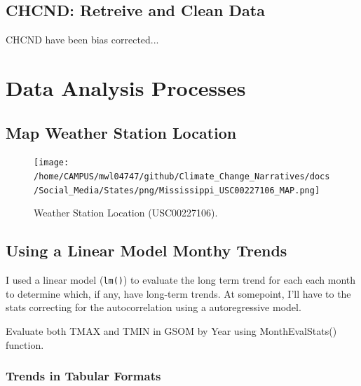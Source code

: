 \documentclass{article}
\begin{document}
\subsection{CHCND: Retreive and Clean Data}

CHCND have been bias corrected...


\section{Data Analysis Processes}

\subsection{Map Weather Station Location}






\begin{figure}
\texttt{[image: /home/CAMPUS/mwl04747/github/Climate\_Change\_Narratives/docs/Social\_Media/States/png/Mississippi\_USC00227106\_MAP.png]}
\caption{Weather Station Location (USC00227106). }
\label{fig:Map}
\end{figure}

\subsection{Using a Linear Model Monthy Trends}

I used a linear model (\texttt{lm()}) to evaluate the long term trend for each each month to determine which, if any, have long-term trends. At somepoint, I'll have to the stats correcting for the autocorrelation using a autoregressive model.  



Evaluate both TMAX and TMIN in GSOM by Year using MonthEvalStats() function. 

\begin{knitrout}
\color{fgcolor}\begin{kframe}


{\ttfamily\noindent\bfseries\color{errorcolor}{\#\# Error in is.data.frame(data): object 'GSOM' not found}}\end{kframe}
\end{knitrout}


\subsubsection{Trends in Tabular Formats}
\end{document}
